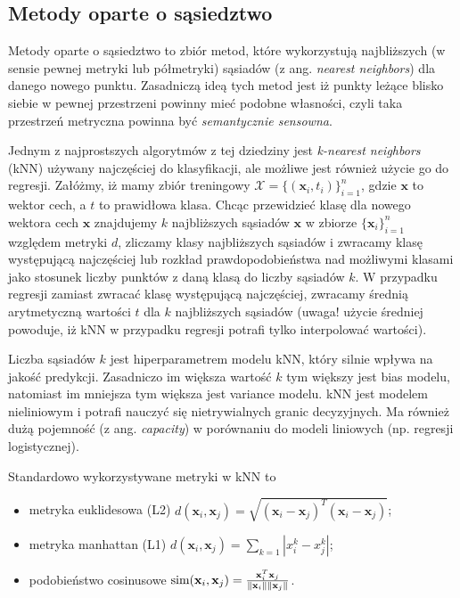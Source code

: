 \documentclass{myclass}
\begin{document}
\subsection{Metody oparte o sąsiedztwo}

Metody oparte o sąsiedztwo to zbiór metod, które wykorzystują najbliższych (w sensie pewnej metryki
lub półmetryki) sąsiadów (z ang. \textit{nearest neighbors}) dla danego nowego punktu. Zasadniczą
ideą tych metod jest iż punkty leżące blisko siebie w pewnej przestrzeni powinny mieć podobne
własności, czyli taka przestrzeń metryczna powinna być \textit{semantycznie sensowna}.

Jednym z najprostszych algorytmów z tej dziedziny jest \textit{k-nearest neighbors} (kNN) używany
najczęściej do klasyfikacji, ale możliwe jest również użycie go do regresji. Załóżmy, iż mamy zbiór
treningowy \(\mathcal{X} = \{(\mathbf{x}_i, t_i)\}_{i=1}^n\), gdzie \(\mathbf{x}\) to wektor cech, a
\(t\) to prawidłowa klasa. Chcąc przewidzieć klasę dla nowego wektora cech \(\mathbf{x}\) znajdujemy
\(k\) najbliższych sąsiadów \(\mathbf{x}\) w zbiorze \(\{\mathbf{x}_i\}_{i=1}^n\) względem metryki
\(d\), zliczamy klasy najbliższych sąsiadów i zwracamy klasę występującą najczęściej lub rozkład
prawdopodobieństwa nad możliwymi klasami jako stosunek liczby punktów z daną klasą do liczby
sąsiadów \(k\). W przypadku regresji zamiast zwracać klasę występującą najczęściej, zwracamy średnią
arytmetyczną wartości \(t\) dla \(k\) najbliższych sąsiadów (uwaga! użycie średniej powoduje, iż kNN
w przypadku regresji potrafi tylko interpolować wartości).

Liczba sąsiadów \(k\) jest hiperparametrem modelu kNN, który silnie wpływa na jakość predykcji.
Zasadniczo im większa wartość \(k\) tym większy jest bias modelu, natomiast im mniejsza tym większa
jest variance modelu. kNN jest modelem nieliniowym i potrafi nauczyć się nietrywialnych granic
decyzyjnych. Ma również dużą pojemność (z ang. \textit{capacity}) w porównaniu do modeli liniowych
(np. regresji logistycznej).

Standardowo wykorzystywane metryki w kNN to
\begin{itemize}
    \item metryka euklidesowa (L2) \(d(\mathbf{x}_i, \mathbf{x}_j) = \sqrt{(\mathbf{x}_i -
    \mathbf{x}_j)^T(\mathbf{x}_i - \mathbf{x}_j)}\);
    \item metryka manhattan (L1) \(d(\mathbf{x}_i, \mathbf{x}_j) = \sum_{k=1} |x_i^k - x_j^k|\);
    \item podobieństwo cosinusowe \(\text{sim}(\mathbf{x}_i, \mathbf{x}_j) =
    \frac{\mathbf{x}_i^T\mathbf{x}_j}{\norm{\mathbf{x}_i}\norm{\mathbf{x}_j}}\).
\end{itemize}
\end{document}
